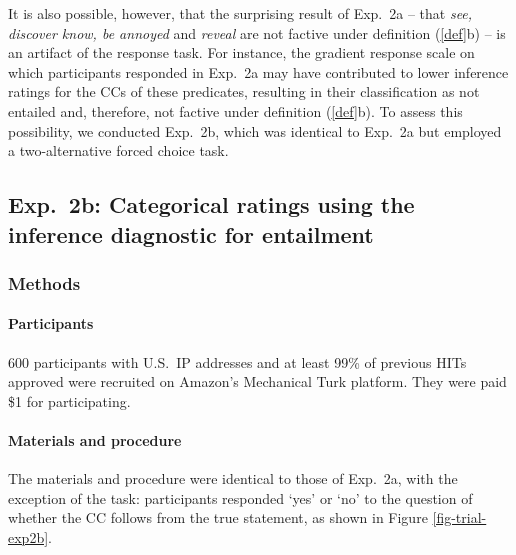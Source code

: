 \documentclass[11pt,fleqn]{article}
\newcommand{\6}{\mbox{$[\hspace*{-.6mm}[$}}
\newcommand{\9}{\mbox{$]\hspace*{-.6mm}]$}}
\begin{document}
It is also possible, however, that the surprising result of Exp.~2a -- that {\em see, discover know, be annoyed} and {\em reveal} are not factive under definition (\ref{def}b) -- is an artifact of the response task. For instance, the gradient response scale on which participants responded in Exp.~2a may have contributed to lower inference ratings for the CCs of these predicates, resulting in their classification as not entailed and, therefore, not factive under definition (\ref{def}b). To assess this possibility, we conducted Exp.~2b, which was identical to Exp.~2a but employed a two-alternative forced choice task.

\subsection{Exp.~2b: Categorical ratings using the inference diagnostic for entailment}

\subsubsection{Methods}

\paragraph{Participants} 600 participants with U.S.\ IP addresses and at least 99\% of previous HITs approved were recruited on Amazon's Mechanical Turk platform. They were paid \$1 for participating.

\paragraph{Materials and procedure} The materials and procedure were identical to those of Exp.~2a, with the exception of the task: participants responded `yes' or `no' to the question of whether the CC follows from the true statement, as shown in Figure \ref{fig-trial-exp2b}.
\end{document}
